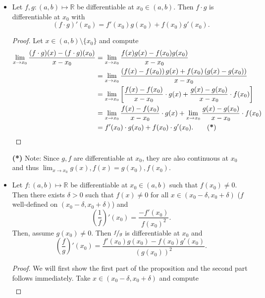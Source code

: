 \documentclass{article}
\newcommand{\R}{\mathbb{R}}
\newcommand{\?}{\stackrel{?}{=}}
\theoremstyle{definition} %
\begin{document}
\begin{itemize}
    \item[]
    \begin{proposition}
        Let $f, g: (a, b) \mapsto \R$ be differentiable at $x_0 \in (a, b)$. Then $f \cdot g$ is differentiable at $x_0$ with
        $$(f \cdot g)'(x_0) = f'(x_0)g(x_0) + f(x_0)g'(x_0).$$
    \end{proposition}
    \begin{proof}
        Let $x \in (a, b) \setminus \{x_0\}$ and compute
        \begin{align*}
            \lim_{x \to x_0} \frac{(f \cdot g)(x) - (f \cdot g)(x_0)}{x - x_0} &= \lim_{x \to x_0} \frac{f(x)g(x) - f(x_0)g(x_0)}{x - x_0} \\
            &= \lim_{x \to x_0} \frac{\left(f(x) - f(x_0)\right)g(x) + f(x_0)\left(g(x) - g(x_0)\right)}{x - x_0} \\
            &= \lim_{x \to x_0} \left[\frac{f(x) - f(x_0)}{x - x_0} \cdot g(x) + \frac{g(x) - g(x_0)}{x - x_0} \cdot f(x_0)\right] \\
            &= \lim_{x \to x_0} \frac{f(x) - f(x_0)}{x - x_0} \cdot g(x) + \lim_{x \to x_0} \frac{g(x) - g(x_0)}{x - x_0} \cdot f(x_0) \\
            &= f'(x_0) \cdot g(x_0) + f(x_0) \cdot g'(x_0). \tag{\textbf{*}}
        \end{align*}
    \end{proof}
    \textbf{(*)} Note: Since $g, f$ are differentiable at $x_0$, they are also continuous at $x_0$ and thus $\lim_{x \to x_0} g(x), f(x) = g(x_0), f(x_0)$.
    \item[]
    \begin{proposition}
        Let $f: (a, b) \mapsto \R$ be differentiable at $x_0 \in (a, b)$ such that $f(x_0) \neq 0$. Then there exists $\delta > 0$ such that $f(x) \neq 0$ for all $x \in (x_0 - \delta, x_0 + \delta)$ ($f$ well-defined on $(x_0 - \delta, x_0 + \delta)$) and
        $$\left(\frac{1}{f}\right)'(x_0) = \frac{-f'(x_0)}{f(x_0)^2}.$$
        Then, assume $g(x_0) \neq 0$. Then $\nicefrac{f}{g}$ is differentiable at $x_0$ and
        $$\left(\frac{f}{g}\right)'(x_0) = \frac{f'(x_0)g(x_0) - f(x_0)g'(x_0)}{(g(x_0))^2}.$$
    \end{proposition}
    \begin{proof}
        We will first show the first part of the proposition and the second part follows immediately. Take $x \in (x_0 - \delta, x_0 + \delta)$ and compute
        \begin{align*}

\end{align*}
\end{proof}
\end{itemize}
\end{document}
